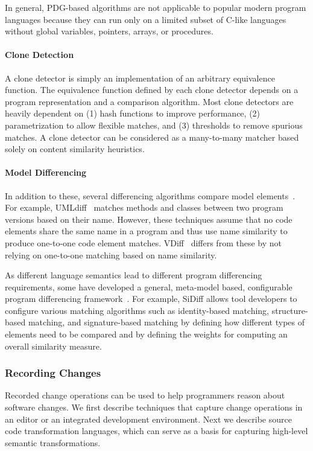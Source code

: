 \documentclass[runningheads,a4paper]{llncs}
\begin{document}
In general, PDG-based algorithms are not applicable to popular modern program languages because they can run only on a limited subset of C-like languages without global variables, pointers, arrays, or procedures. 


\paragraph{Clone Detection} 
A clone detector is simply an implementation of an arbitrary equivalence function. The equivalence function defined by each clone detector depends on a program representation and a comparison algorithm. Most clone detectors are heavily dependent on (1) hash functions to improve performance, (2) parametrization to allow flexible matches, and (3) thresholds to remove spurious matches. A clone detector can be considered as a many-to-many matcher based solely on content similarity heuristics. 

\paragraph{Model Differencing} 
In addition to these, several differencing algorithms compare model elements~\cite{Xing2005, Ohst2003:umldiff, Soto2006:deltaprocess}. For example, UMLdiff~\cite{Xing2005} matches methods and classes between two program versions based on their name. However, these techniques assume that no code elements share the same name in a program and thus use name similarity to produce one-to-one code element matches.  VDiff~\cite{Duley2012:vdiff,Duley2010:vdiff} differs from these by not relying on one-to-one matching based on name similarity. 

As different language semantics lead to different program differencing requirements, some have developed a general, meta-model based, configurable program differencing framework~\cite{Schmidt2008:sidiff, EMF}. For example, SiDiff \cite{Schmidt2008:sidiff, Treude2007:sidiff} allows tool developers to configure various matching algorithms such as identity-based matching, structure-based matching, and signature-based matching by defining how different types of elements need to be compared and by defining the weights for computing an overall similarity measure.

\subsubsection{Recording Changes} 
Recorded change operations can be used to help programmers reason about software changes. We first describe techniques that capture change operations in an editor or an integrated development environment. Next we describe source code transformation languages, which can serve as a basis for capturing high-level semantic transformations. 
\end{document}
